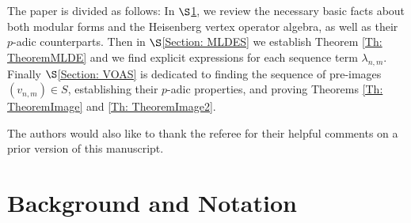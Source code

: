 \documentclass[10pt,a4paper]{amsart}
\numberwithin{equation}{section}
\theoremstyle{definition}
\newcommand{\Heis}{S}
\newcommand{\haupt}{\lambda}
\begin{document}
The paper is divided as follows: In $\S$\ref{Section: Background}, we review the necessary basic facts about both modular forms and the Heisenberg vertex operator algebra, as well as their $p$-adic counterparts. Then in $\S$\ref{Section: MLDES} we establish Theorem \ref{Th: TheoremMLDE} and we find explicit expressions for each sequence term $\haupt_{n,m}$. Finally $\S$\ref{Section: VOAS} is dedicated to finding the sequence of pre-images $(v_{n,m}) \in \Heis$, establishing their $p$-adic properties, and proving Theorems \ref{Th: TheoremImage} and \ref{Th: TheoremImage2}.

The authors would also like to thank the referee for their helpful comments on a prior version of this manuscript.

\section{Background and Notation} \label{Section: Background}
\end{document}
